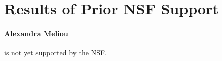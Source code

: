 \section{Results of Prior NSF Support}
\label{sec:prior}



\paragraph{Alexandra Meliou} is not yet supported by the NSF.

